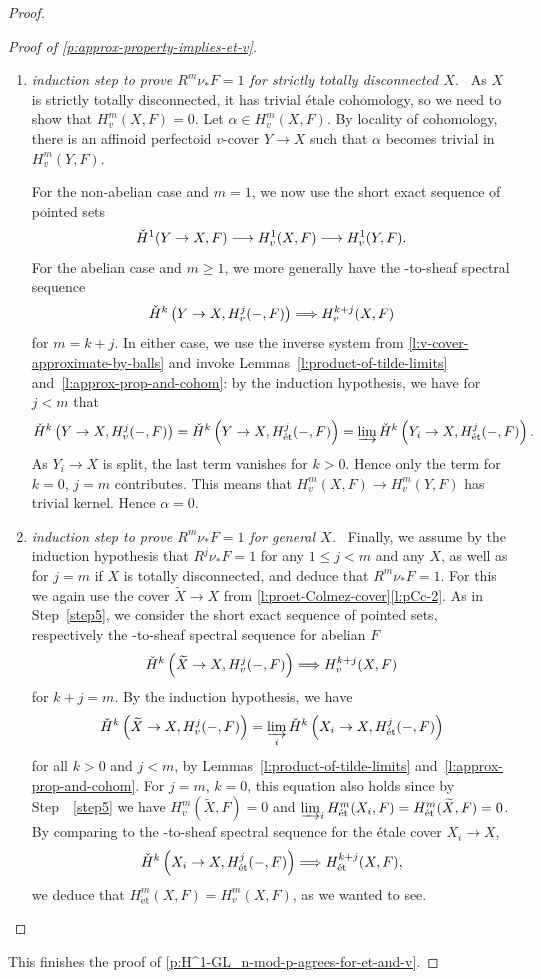 \documentclass[10pt,a4paper]{article}
\theoremstyle{definition}
\theoremstyle{remark}
\newcommand{\lra}{\longrightarrow}
\newcommand{\et}{{\operatorname{\acute{e}t}}}
\newcommand{\wt}{\widetilde}
\newcommand{\cH}{{\ifmmode \check{H}\else{\v{C}ech}\fi}}
\numberwithin{equation}{section}
\begin{document}
\begin{proof}
\begin{proof}[Proof of \cref{p:approx-property-implies-et-v}]
\begin{enumerate}[label={\emph{Step}~\arabic*:}, ref=\arabic*,wide]
\item\label{step5} \emph{induction step to prove $R^m\nu_{\ast}F=1$  for strictly totally disconnected $X$.}~	
		As $X$ is strictly totally disconnected, it has trivial \'etale cohomology, so we need to show that $H^m_{v}(X,F)=0$.
		Let $\alpha \in H^m_{v}(X,F)$. By locality of cohomology, there is an affinoid perfectoid $v$-cover $Y\to X$ such that $\alpha$ becomes trivial in $H^m_{v}(Y,F)$.  
		
		For the non-abelian case and $m=1$, we now use the short exact sequence of pointed sets
		\[ \cH^1(Y\to X,F)\lra H^{1}_v(X,F)\lra H^1_v(Y,F).\]
		For the abelian case and  $m\geq 1$, we more generally have the \cH-to-sheaf spectral sequence 
		\[ \cH^k\left(Y\to X,H^j_v(-,F)\right)\Longrightarrow H^{k+j}_v(X,F)\]
		for $m=k+j$. In either case, we use the inverse system from \cref{l:v-cover-approximate-by-balls} and invoke Lemmas~\ref{l:product-of-tilde-limits} and~\ref{l:approx-prop-and-cohom}: by the induction hypothesis,
                we have for $j<m$ that
		\[ \cH^k\left(Y\to X,H^j_v(-,F)\right)=\cH^k\left(Y\to X,H^j_{\et}(-,F)\right)=\varinjlim\cH^k\left(Y_i\to X,H^j_{\et}(-,F)\right).\]
		As $Y_i\to X$ is split, the last term vanishes for $k>0$. Hence only the term for $k=0$, $j=m$ contributes. This means that $H^{m}_v(X,F)\to H^m_v(Y,F)$
		has trivial kernel. Hence $\alpha=0$.
		
\item\label{step6} \emph{induction step to prove $R^m\nu_{\ast}F=1$  for general $X$.}~
  Finally, we assume by the induction hypothesis
  that $R^j\nu_{\ast}F=1$ for any $1\leq j< m$ and any $X$, as well as for $j=m$ if $X$ is totally disconnected, and deduce that $R^m\nu_{\ast}F=1$. For this we again use the cover $\wt X\to X$ from \cref{l:proet-Colmez-cover}\eqref{l:pCc-2}. As in Step~\ref{step5}, we consider the short exact sequence of pointed sets, respectively the \cH-to-sheaf spectral sequence for abelian $F$
		\[ \cH^k\left(\wt X\to X,H^j_v(-,F)\right)\Longrightarrow H^{k+j}_v(X,F)\]
		for $k+j=m$.
		By the induction hypothesis, we have
		\[ \cH^k\left(\wt X\to X,H^j_v(-,F)\right)=\varinjlim_i  \cH^k\left(X_i\to X,H^j_{\et}(-,F)\right)\]
		for all $k>0$ and $j<m$, by Lemmas~\ref{l:product-of-tilde-limits} and~\ref{l:approx-prop-and-cohom}. For $j=m$, $k=0$, this equation also holds since by Step~~\ref{step5} we have $H^m_v(\wt X,F)=0$ and $\varinjlim_iH^m_{\et}(X_i,F)=H^m_{\et}(\wt X,F)=0$.  By comparing to the \cH-to-sheaf spectral sequence for the \'etale cover $X_i\to X$,
		\[ \cH^k\left(X_i\to X,H^j_{\et}(-,F)\right)\Longrightarrow H^{k+j}_{\et}(X,F),\]
		 we deduce that 
		 $H^{m}_{\et}(X,F)=H^{m}_v(X,F)$, as we wanted to see.\qedhere
                 \end{enumerate}
	\end{proof}
	
	This finishes the proof of \cref{p:H^1-GL_n-mod-p-agrees-for-et-and-v}.
\end{proof}
\end{document}
